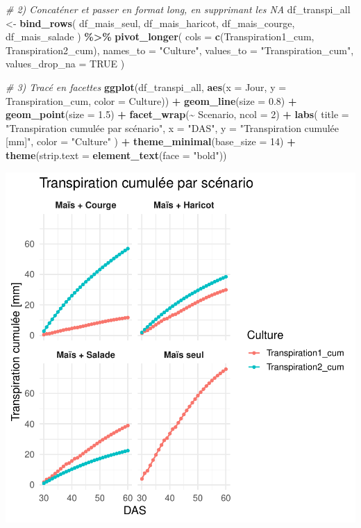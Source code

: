 \documentclass[
]{article}
\newenvironment{Shaded}{\begin{snugshade}}{\end{snugshade}}
\newcommand{\AttributeTok}[1]{\textcolor[rgb]{0.13,0.29,0.53}{#1}}
\newcommand{\CommentTok}[1]{\textcolor[rgb]{0.56,0.35,0.01}{\textit{#1}}}
\newcommand{\ConstantTok}[1]{\textcolor[rgb]{0.56,0.35,0.01}{#1}}
\newcommand{\DecValTok}[1]{\textcolor[rgb]{0.00,0.00,0.81}{#1}}
\newcommand{\FloatTok}[1]{\textcolor[rgb]{0.00,0.00,0.81}{#1}}
\newcommand{\FunctionTok}[1]{\textcolor[rgb]{0.13,0.29,0.53}{\textbf{#1}}}
\newcommand{\NormalTok}[1]{#1}
\newcommand{\OtherTok}[1]{\textcolor[rgb]{0.56,0.35,0.01}{#1}}
\newcommand{\SpecialCharTok}[1]{\textcolor[rgb]{0.81,0.36,0.00}{\textbf{#1}}}
\newcommand{\StringTok}[1]{\textcolor[rgb]{0.31,0.60,0.02}{#1}}
\begin{document}
\begin{Shaded}
\begin{Highlighting}[]
\CommentTok{\# 2) Concaténer et passer en format long, en supprimant les NA}
\NormalTok{df\_transpi\_all }\OtherTok{\textless{}{-}} \FunctionTok{bind\_rows}\NormalTok{(}
\NormalTok{  df\_mais\_seul,}
\NormalTok{  df\_mais\_haricot,}
\NormalTok{  df\_mais\_courge,}
\NormalTok{  df\_mais\_salade}
\NormalTok{) }\SpecialCharTok{\%\textgreater{}\%}
  \FunctionTok{pivot\_longer}\NormalTok{(}
    \AttributeTok{cols           =} \FunctionTok{c}\NormalTok{(Transpiration1\_cum, Transpiration2\_cum),}
    \AttributeTok{names\_to       =} \StringTok{"Culture"}\NormalTok{,}
    \AttributeTok{values\_to      =} \StringTok{"Transpiration\_cum"}\NormalTok{,}
    \AttributeTok{values\_drop\_na =} \ConstantTok{TRUE}
\NormalTok{  )}

\CommentTok{\# 3) Tracé en facettes}
\FunctionTok{ggplot}\NormalTok{(df\_transpi\_all, }\FunctionTok{aes}\NormalTok{(}\AttributeTok{x =}\NormalTok{ Jour, }\AttributeTok{y =}\NormalTok{ Transpiration\_cum, }\AttributeTok{color =}\NormalTok{ Culture)) }\SpecialCharTok{+}
  \FunctionTok{geom\_line}\NormalTok{(}\AttributeTok{size =} \FloatTok{0.8}\NormalTok{) }\SpecialCharTok{+}
  \FunctionTok{geom\_point}\NormalTok{(}\AttributeTok{size =} \FloatTok{1.5}\NormalTok{) }\SpecialCharTok{+}
  \FunctionTok{facet\_wrap}\NormalTok{(}\SpecialCharTok{\textasciitilde{}}\NormalTok{ Scenario, }\AttributeTok{ncol =} \DecValTok{2}\NormalTok{) }\SpecialCharTok{+}
  \FunctionTok{labs}\NormalTok{(}
    \AttributeTok{title =} \StringTok{"Transpiration cumulée par scénario"}\NormalTok{,}
    \AttributeTok{x     =} \StringTok{"DAS"}\NormalTok{,}
    \AttributeTok{y     =} \StringTok{"Transpiration cumulée [mm]"}\NormalTok{,}
    \AttributeTok{color =} \StringTok{"Culture"}
\NormalTok{  ) }\SpecialCharTok{+}
  \FunctionTok{theme\_minimal}\NormalTok{(}\AttributeTok{base\_size =} \DecValTok{14}\NormalTok{) }\SpecialCharTok{+}
  \FunctionTok{theme}\NormalTok{(}\AttributeTok{strip.text =} \FunctionTok{element\_text}\NormalTok{(}\AttributeTok{face =} \StringTok{"bold"}\NormalTok{))}
\end{Highlighting}
\end{Shaded}

\begin{center}\includegraphics[width=0.7\linewidth]{Rapport_final_Maxime_CORNEZ_files/figure-latex/graphe-transpi-cum-1} \end{center}
\end{document}
